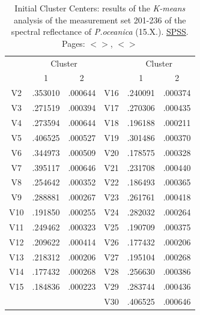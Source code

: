 \documentclass[11pt]{article}
\begin{document}
\begin{appendices}
\begin{table}[H]\footnotesize
	\caption{Initial Cluster Centers: results of the \textit{K-means} analysis of the measurement set 201-236 of the spectral reflectance of \textit{P.oceanica} (15.X.).  \href{http://www.spss.com/}{SPSS}.  Pages: $<$\pageref{page-30}$>$, $<$\pageref{page-41}$>$}
	\label{tab:13}
	\begin{center}
	\begin{tabular}{|c|c|c|c|c|c|}
		\hline\hline
		& \multicolumn{2}{|c|}{Cluster} &  & \multicolumn{2}{|c|}{Cluster}\\
		 & 1 & 2 &  & 1 & 2 \\ \hline\hline
		V2 &	.353010 &	.000644 &	V16 &	.240091 &	.000374 \\ \hline
		V3 &	 .271519 &	.000394 &	V17 &	.270306 &	.000435 \\ \hline
		V4 &	.273594 &	.000644 &	V18 &	.196188 &	.000211 \\ \hline
		V5 &	.406525 &	.000527 &	V19 &	.301486 &	.000370 \\ \hline
		V6 &	.344973 &	.000509 &	V20 &	.178575 &	.000328 \\ \hline
		V7 &	.395117 &	.000646 &	V21 &	.231708 &	.000440 \\ \hline
		V8 &	.254642 &	.000352 &	V22 &	.186493 &	.000365 \\ \hline
		V9 &	.288881 &	.000267 &	V23 &	.261761 &	.000418 \\ \hline
		V10 &	.191850 &	.000255 &	V24 &	.282032 &	.000264 \\ \hline
		V11 &	.249462 &	.000323 &	V25 &	.190709 &	.000375 \\ \hline
		V12 &	.209622 &	.000414 &	V26 &	.177432 &	.000206 \\ \hline
		V13 &	.218312 &	.000206 &	V27 &	.195104 &	.000268 \\ \hline
		V14 &	.177432 &	.000268 &	V28 &	.256630 &	.000386 \\ \hline
		V15 &	.184836 &	.000223 &	V29 &	.283744 &	.000436 \\ \hline
		 &	 &	 &		V30 &	.406525 &	.000646 \\ \hline
	\end{tabular}
	\end{center}
	\label{tab:20}
\end{table}


\end{appendices}
\end{document}
